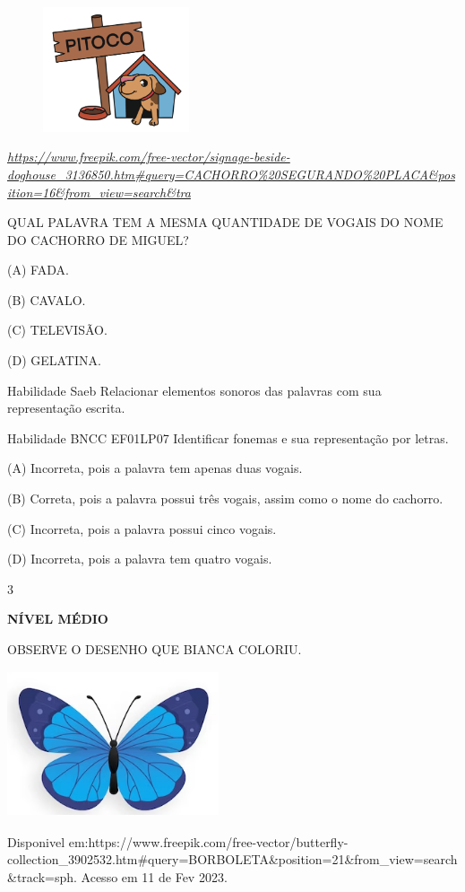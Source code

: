 \begin{escola}
\includegraphics[width=2.53194in,height=1.44514in]{media/image226.png}

\href{https://www.freepik.com/free-vector/signage-beside-doghouse_3136850.htm\#query=CACHORRO\%20SEGURANDO\%20PLACA\&position=16\&from_view=search\&tra}{\emph{https://www.freepik.com/free-vector/signage-beside-doghouse\_3136850.htm\#query=CACHORRO\%20SEGURANDO\%20PLACA\&position=16\&from\_view=search\&tra}}

QUAL PALAVRA TEM A MESMA QUANTIDADE DE VOGAIS DO NOME DO CACHORRO DE
MIGUEL?

(A) FADA.

(B) CAVALO.

(C) TELEVISÃO.

(D) GELATINA.

Habilidade Saeb Relacionar elementos sonoros das palavras com sua
representação escrita.

Habilidade BNCC EF01LP07 Identificar fonemas e sua representação por
letras.

(A) Incorreta, pois a palavra tem apenas duas vogais.

(B) Correta, pois a palavra possui três vogais, assim como o nome do
cachorro.

(C) Incorreta, pois a palavra possui cinco vogais.

(D) Incorreta, pois a palavra tem quatro vogais.

\num{3}

\textbf{NÍVEL MÉDIO}

OBSERVE O DESENHO QUE BIANCA COLORIU.

\includegraphics[width=2.45833in,height=1.69432in]{media/image227.png}

Disponivel
em:https://www.freepik.com/free-vector/butterfly-collection\_3902532.htm\#query=BORBOLETA\&position=21\&from\_view=search\&track=sph.
Acesso em 11 de Fev 2023.


\end{escola}
